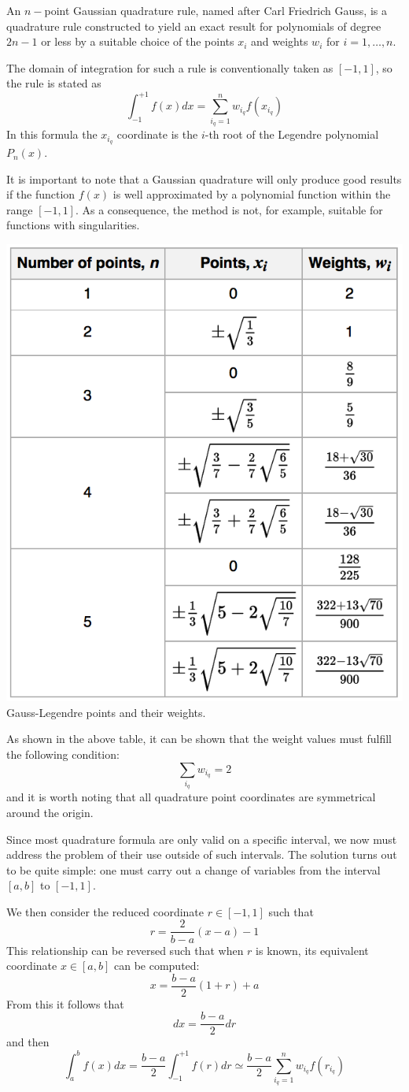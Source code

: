 An $n-$point Gaussian quadrature rule, named after Carl Friedrich Gauss, is a quadrature rule constructed
to yield an exact result for polynomials of degree $2n-1$ or less by a suitable choice of the points $x_i$
and weights $w_i$ for $i=1,\dots,n$.

The domain of integration for such a rule is conventionally taken as $[-1,1]$, so the rule is stated as
\[
\int_{-1}^{+1} f(x) dx = \sum_{i_q=1}^n w_{i_q} f(x_{i_q})
\]
In this formula the $x_{i_q}$ coordinate is 
the $i$-th root of the Legendre polynomial $P_n(x)$. 

It is important to note that a Gaussian quadrature will only produce good results if the function $f(x)$
is well approximated by a polynomial function within the range $[-1,1]$.
As a consequence, the method is not, for example, suitable for functions with singularities.

\begin{center}
\includegraphics[width=5.cm]{images/quadrature/gq2}\\
Gauss-Legendre points and their weights.
\end{center}

As shown in the above table, it can be shown that the weight values must fulfill the following condition:
\begin{equation}
\sum_{i_q} w_{i_q}=2 \label{gq23}
\end{equation}
and it is worth noting that all quadrature point coordinates are symmetrical around the origin.

Since most quadrature formula are only valid on a specific interval, we now must address the problem 
of their use outside of such intervals. The solution turns out to be quite simple: one 
must carry out a change of variables from the interval $[a,b]$ to $[-1,1]$.

We then consider the reduced coordinate $r\in[-1,1]$ such that 
\[
r=\frac{2}{b-a}(x-a)-1 
\]
This relationship can be reversed such that when $r$ is known, its equivalent coordinate 
$x\in[a,b]$ can be computed:
\[
x=\frac{b-a}{2}(1+r)+a
\]
From this it follows that
\[
dx=\frac{b-a}{2}dr
\]
and then 
\[
\int_a^b f(x) dx  = \frac{b-a}{2} \int_{-1}^{+1} f(r) dr \simeq 
\frac{b-a}{2} \sum_{i_q=1}^n w_{i_q} f(r_{i_q})
\]


